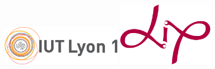 \begin{spacing}{1}
	\begin{figure}[b]
		\begin{minipage}[c]{.48\linewidth}
			\center
			\includegraphics[width=5cm]{pagedegarde/images/logo_iut.png}
		\end{minipage} \hfill
		\begin{minipage}[c]{.48\linewidth}
			\center
			\includegraphics[width=4cm]{pagedegarde/images/logo_lip.png}
		\end{minipage}
	\end{figure}
\end{spacing}